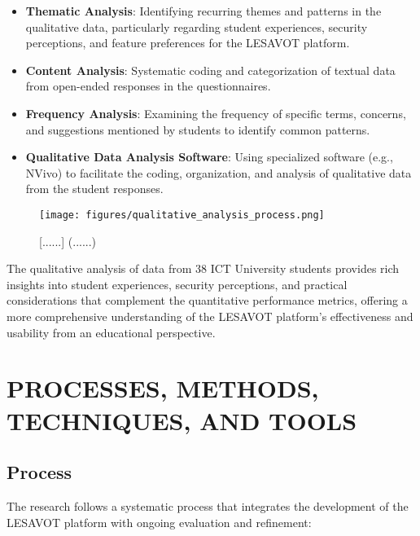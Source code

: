 \documentclass[12pt, a4paper, oneside]{book}
\begin{document}
\begin{itemize}[leftmargin=*]
    \item \textbf{Thematic Analysis}: Identifying recurring themes and patterns in the qualitative data, particularly regarding student experiences, security perceptions, and feature preferences for the LESAVOT platform.

    \item \textbf{Content Analysis}: Systematic coding and categorization of textual data from open-ended responses in the questionnaires.

    \item \textbf{Frequency Analysis}: Examining the frequency of specific terms, concerns, and suggestions mentioned by students to identify common patterns.

    \item \textbf{Qualitative Data Analysis Software}: Using specialized software (e.g., NVivo) to facilitate the coding, organization, and analysis of qualitative data from the student responses.
\end{itemize}

\begin{figure}[htbp]
    \centering
    \texttt{[image: figures/qualitative\_analysis\_process.png]}
    \caption{[......] (......)}
    \label{fig:qualitative_analysis}
\end{figure}

The qualitative analysis of data from 38 ICT University students provides rich insights into student experiences, security perceptions, and practical considerations that complement the quantitative performance metrics, offering a more comprehensive understanding of the LESAVOT platform's effectiveness and usability from an educational perspective.

\section{PROCESSES, METHODS, TECHNIQUES, AND TOOLS}

\subsection{Process}
The research follows a systematic process that integrates the development of the LESAVOT platform with ongoing evaluation and refinement:
\end{document}
